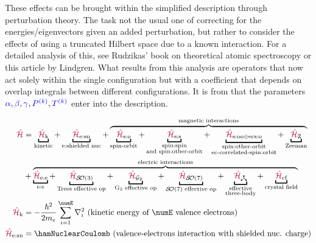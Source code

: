 \documentclass[11pt, twoside,openright]{article}
\begin{document}
These effects can be brought within the simplified description through perturbation theory. The task not the usual one of correcting for the energies/eigenvectors given an added perturbation, but rather to consider the effects of using a truncated Hilbert space due to a known interaction. For a detailed analysis of this, see Rudzikas' book \cite{rudzikas_theoretical_2007} on theoretical atomic spectroscopy or this article \cite{lindgren_rayleigh-schrodinger_1974} by Lindgren. What results from this analysis are operators that now act solely within the single configuration but with a coefficient that depends on overlap integrals between different configurations. It is from \confint that the parameters $\textcolor{blue}{{\alpha}}, \textcolor{blue}{{\beta}}, \textcolor{blue}{{\gamma}}, \textcolor{blue}{P^{(k)}}, \textcolor{blue}{T^{(k)}}$ enter into the description.

\begin{mdframed}
\begin{align} 
	\ham &= \underbracket{\hamKineticSymbol}_{\text{kinetic}}
		 + \underbracket{\hamNuclearCoulombSymbol}_{\text{e:shielded nuc}}
		 + \overbrace{\underbracket{\hamSpinOrbitSymbol}_{\text{spin-orbit}}
		 + \underbracket{\hamSpinSpinSymbol}_{
		 			\substack{
		 				\text{spin:spin} \\ 
		 				\text{and spin:other-orbit}
		 				}
		 			} 
         + \underbracket{\hamSOOplusECSOSymbol}_{
            \substack{
                \text{spin:other-orbit} \\ 
                \text{ec-correlated-spin:orbit}
                }
         }
         + \underbracket{\hamZeemanSymbol}_{\text{Zeeman}}}^{\text{magnetic interactions}}  \nonumber \\
         & + \overbrace{\underbracket{\hamCoulombEESymbol}_{\text{e:e}} 
         + \underbracket{\hamTreesSymbol}_\text{Trees effective op} 
		 + \underbracket{\hamGTwoSymbol}_\text{G${}_2$ effective op} 
		 + \underbracket{\hamSOSevenSymbol}_\text{$\SO{7}$ effective op} 
		 + \underbracket{\ham_{\trispoke}}_{\substack{
            \text{effective} \\
            \text{three-body}}}
         + \underbracket{\hamCrystalFieldSymbol}_{\text{crystal field}}}^{\text{electric interactions}} \label{eqn:hamiltonian} \\
	\hamKineticSymbol &= -\frac{\hbar^2}{2m_e}\sum_{i=1}^\numE \nabla_i^2 \text{ (kinetic energy of $\numE$ valence electrons)}\\
	\hamNuclearCoulombSymbol &= \hamNuclearCoulomb \text{ (valence-electrons interaction with shielded nuc. charge)} \\

\end{align}
\end{mdframed}
\end{document}
